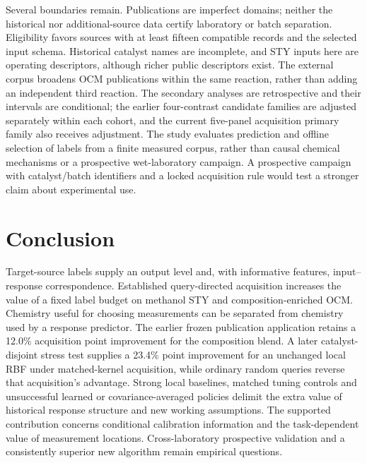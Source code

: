 \documentclass[11pt]{article}
\begin{document}
Several boundaries remain. Publications are imperfect domains; neither the historical nor additional-source data certify laboratory or batch separation. Eligibility favors sources with at least fifteen compatible records and the selected input schema. Historical catalyst names are incomplete, and STY inputs here are operating descriptors, although richer public descriptors exist. The external corpus broadens OCM publications within the same reaction, rather than adding an independent third reaction. The secondary analyses are retrospective and their intervals are conditional; the earlier four-contrast candidate families are adjusted separately within each cohort, and the current five-panel acquisition primary family also receives adjustment. The study evaluates prediction and offline selection of labels from a finite measured corpus, rather than causal chemical mechanisms or a prospective wet-laboratory campaign. A prospective campaign with catalyst/batch identifiers and a locked acquisition rule would test a stronger claim about experimental use.

\section{Conclusion}
Target-source labels supply an output level and, with informative features, input--response correspondence. Established query-directed acquisition increases the value of a fixed label budget on methanol STY and composition-enriched OCM. Chemistry useful for choosing measurements can be separated from chemistry used by a response predictor. The earlier frozen publication application retains a 12.0\% acquisition point improvement for the composition blend. A later catalyst-disjoint stress test supplies a 23.4\% point improvement for an unchanged local RBF under matched-kernel acquisition, while ordinary random queries reverse that acquisition's advantage. Strong local baselines, matched tuning controls and unsuccessful learned or covariance-averaged policies delimit the extra value of historical response structure and new working assumptions. The supported contribution concerns conditional calibration information and the task-dependent value of measurement locations. Cross-laboratory prospective validation and a consistently superior new algorithm remain empirical questions.
\end{document}
